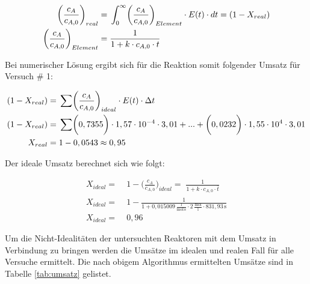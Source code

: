\documentclass[12pt,liststotoc]{report}
\begin{document}
\begin{align}
\biggl(\frac{c_A}{c_{A,0}}\biggr)_{real} =&\; \int_{0}^{\infty} \biggl(\frac{{c}_A}{c_{A,0}}\biggr)_{Element} \cdot E(t)\cdot dt = (1-X_{real})\\
\biggl(\frac{{c}_A}{c_{A,0}}\biggr)_{Element} =&\; \frac{1}{1+k\cdot c_{A,0}\cdot t}\notag
\end{align}

Bei numerischer Lösung ergibt sich für die Reaktion somit folgender Umsatz für Versuch $\#$ 1:

\begin{align*}
 (1-X_{real}) =&\; \sum \biggl(\frac{{c}_A}{c_{A,0}}\biggr)_{ideal} \cdot E(t)\cdot \Delta t\\ \label{gl_Umsatz}
 (1-X_{real}) =&\; \sum \biggl(0,7355\biggr) \cdot 1,57\cdot 10^{-4} \cdot 3,01 + ... +  \biggl(0,0232 \biggr) \cdot 1,55 \cdot 10^{4} \cdot 3,01 \notag \\ 
 X_{real} =&\; 1 - 0,0543  \approx 0,95 \notag
\end{align*}
\noindent

Der ideale Umsatz berechnet sich wie folgt:

\begin{align}
 X_{ideal} =&\; 1 - \biggl(\frac{{c}_A}{c_{A,0}}\biggr)_{ideal} =\; \frac{1}{1+k\cdot c_{A,0}\cdot \bar{t}}\\
X_{ideal} =&\;1 - \frac{1}{1+ 0,015009\,\frac{\text{l}}{\text{mol}\,\text{s}}\cdot 2\,\frac{\text{mol}}{\text{l}}\cdot 831,93\,\text{s}}\nonumber\\
X_{ideal} =&\; 0,96\nonumber
\end{align}

Um die Nicht-Idealitäten der untersuchten Reaktoren mit dem Umsatz in Verbindung zu bringen werden die Umsätze im idealen und realen Fall für alle Versuche ermittelt. Die nach obigem Algorithmus ermittelten Umsätze sind in Tabelle \ref{tab:umsatz} gelistet.
\end{document}
